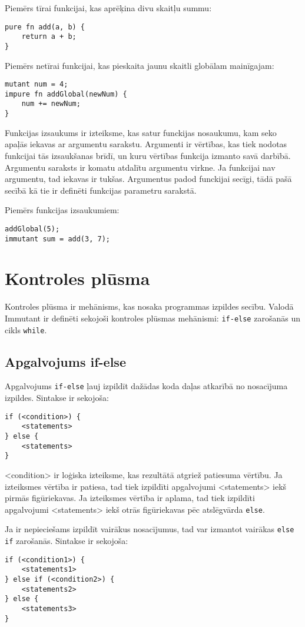 \documentclass[12pt,a4paper]{report}
\begin{document}
Piemērs tīrai funkcijai, kas aprēķina divu skaitļu summu:
\begin{verbatim}
pure fn add(a, b) {
    return a + b;
}
\end{verbatim}

Piemērs netīrai funkcijai, kas pieskaita jaunu skaitli globālam mainīgajam:
\begin{verbatim}
mutant num = 4;
impure fn addGlobal(newNum) {
    num += newNum;
}
\end{verbatim}

Funkcijas izsaukums ir izteiksme, kas satur funckijas nosaukumu, kam seko apaļās iekavas ar argumentu sarakstu. Argumenti ir vērtības, kas tiek nodotas funkcijai tās izsaukšanas brīdī, un kuru vērtības funkcija izmanto savā darbībā. Argumentu saraksts ir komatu atdalītu argumentu virkne. Ja funkcijai nav argumentu, tad iekavas ir tukšas. Argumentus padod funckijai secīgi, tādā pašā secībā kā tie ir definēti funkcijas parametru sarakstā. 

Piemērs funkcijas izsaukumiem:
\begin{verbatim}
addGlobal(5);
immutant sum = add(3, 7);
\end{verbatim}

\section{Kontroles plūsma}
Kontroles plūsma ir mehānisms, kas nosaka programmas izpildes secību. Valodā Immutant ir definēti sekojoši kontroles plūsmas mehānismi: \texttt{if-else} zarošanās un cikls \texttt{while}.

\subsection{Apgalvojums if-else}

Apgalvojums \texttt{if-else} ļauj izpildīt dažādas koda daļas atkarībā no nosacījuma izpildes. Sintakse ir sekojoša:
\begin{verbatim}
if (<condition>) {
    <statements>
} else {
    <statements>
}
\end{verbatim}

<condition> ir loģiska izteiksme, kas rezultātā atgriež patiesuma vērtību. Ja izteiksmes vērtība ir patiesa, tad tiek izpildīti apgalvojumi <statements> iekš pirmās figūriekavas. Ja izteiksmes vērtība ir aplama, tad tiek izpildīti apgalvojumi <statements> iekš otrās figūriekavas pēc atslēgvārda \texttt{else}.

Ja ir nepieciešams izpildīt vairākus nosacījumus, tad var izmantot vairākas \texttt{else if} zarošanās. Sintakse ir sekojoša:
\begin{verbatim}
if (<condition1>) {
    <statements1>
} else if (<condition2>) {
    <statements2>
} else {
    <statements3>
}
\end{verbatim}
\end{document}
